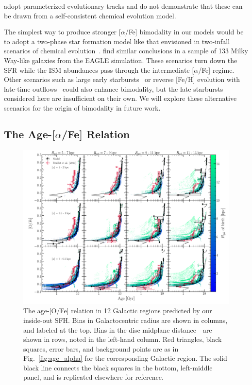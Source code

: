 \documentclass[draft2.tex]{subfiles}
\begin{document}
adopt parameterized evolutionary tracks and do not demonstrate that these can 
be drawn from a self-consistent chemical evolution model. 
\par 
The simplest way to produce stronger [$\alpha$/Fe] bimodality in our models 
would be to adopt a two-phase star formation model like that envisioned in 
two-infall scenarios of chemical evolution~\citep[e.g.][]{Chiappini1997, 
Chiappini2001, Romano2010, Grisoni2017, Noguchi2018, Palla2020, Spitoni2016, 
Spitoni2018, Spitoni2019a, Spitoni2020, Spitoni2021}. 
\citet{Mackereth2018} find similar conclusions in a sample of 133 Milky 
Way-like galaxies from the EAGLE simulation.
These scenarios turn down the SFR while the ISM abundances pass through the 
intermediate [$\alpha$/Fe] regime. 
Other scenarios such as large early starbursts~\citep{Clarke2019} or reverse 
[Fe/H] evolution with late-time outflows~\citep{Weinberg2017} could also 
enhance bimodality, but the late starbursts considered here are insufficient 
on their own. 
We will explore these alternative scenarios for the origin of bimodality in 
future work. 

\subsection{The Age-[$\alpha$/Fe] Relation} 
\label{sec:obs_comp:age_alpha} 

\begin{figure} 
\centering 
\includegraphics[scale = 0.32]{age_alpha_regions.pdf} 
\caption{The age-[O/Fe] relation in 12 Galactic regions predicted by our 
inside-out SFH. Bins in Galactocentric radius are shown in columns, and labeled 
at the top. 
Bins in the disc midplane distance~\absz~are shown in rows, noted in the 
left-hand column. Red triangles, black squares, 
error bars, and background points are as in Fig.~\ref{fig:age_alpha} for the 
corresponding Galactic region. The solid black line connects the black squares 
in the bottom, left-middle panel, and is replicated elsewhere for reference. } 
\label{fig:age_alpha_regions} 
\end{figure} 
\end{document}
